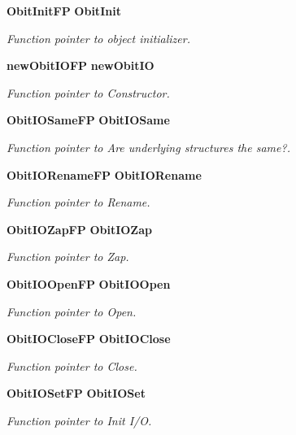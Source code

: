 \begin{CompactItemize}
{\bf Obit\-Init\-FP} {\bf Obit\-Init}
\begin{CompactList}\small\item\em Function pointer to object initializer. \item\end{CompactList}\item 
{\bf new\-Obit\-IOFP} {\bf new\-Obit\-IO}
\begin{CompactList}\small\item\em Function pointer to Constructor. \item\end{CompactList}\item 
{\bf Obit\-IOSame\-FP} {\bf Obit\-IOSame}
\begin{CompactList}\small\item\em Function pointer to Are underlying structures the same?. \item\end{CompactList}\item 
{\bf Obit\-IORename\-FP} {\bf Obit\-IORename}
\begin{CompactList}\small\item\em Function pointer to Rename. \item\end{CompactList}\item 
{\bf Obit\-IOZap\-FP} {\bf Obit\-IOZap}
\begin{CompactList}\small\item\em Function pointer to Zap. \item\end{CompactList}\item 
{\bf Obit\-IOOpen\-FP} {\bf Obit\-IOOpen}
\begin{CompactList}\small\item\em Function pointer to Open. \item\end{CompactList}\item 
{\bf Obit\-IOClose\-FP} {\bf Obit\-IOClose}
\begin{CompactList}\small\item\em Function pointer to Close. \item\end{CompactList}\item 
{\bf Obit\-IOSet\-FP} {\bf Obit\-IOSet}
\begin{CompactList}\small\item\em Function pointer to Init I/O. \item\end{CompactList}\item 

\end{CompactItemize}
